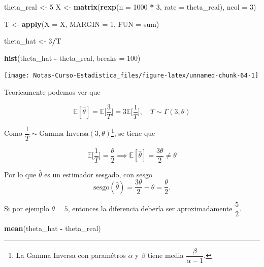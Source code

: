 \documentclass[
  12pt,
]{book}
\newenvironment{Shaded}{\begin{snugshade}}{\end{snugshade}}
\newcommand{\DataTypeTok}[1]{\textcolor[rgb]{0.13,0.29,0.53}{#1}}
\newcommand{\DecValTok}[1]{\textcolor[rgb]{0.00,0.00,0.81}{#1}}
\newcommand{\KeywordTok}[1]{\textcolor[rgb]{0.13,0.29,0.53}{\textbf{#1}}}
\newcommand{\NormalTok}[1]{#1}
\newcommand{\OperatorTok}[1]{\textcolor[rgb]{0.81,0.36,0.00}{\textbf{#1}}}
\newcommand{\StringTok}[1]{\textcolor[rgb]{0.31,0.60,0.02}{#1}}
\begin{document}
\begin{Shaded}
\begin{Highlighting}[]
\NormalTok{theta\_real \textless{}{-}}\StringTok{ }\DecValTok{5}
\NormalTok{X \textless{}{-}}\StringTok{ }\KeywordTok{matrix}\NormalTok{(}\KeywordTok{rexp}\NormalTok{(}\DataTypeTok{n =} \DecValTok{1000} \OperatorTok{*}\StringTok{ }\DecValTok{3}\NormalTok{, }\DataTypeTok{rate =}\NormalTok{ theta\_real), }
    \DataTypeTok{ncol =} \DecValTok{3}\NormalTok{)}

\NormalTok{T \textless{}{-}}\StringTok{ }\KeywordTok{apply}\NormalTok{(}\DataTypeTok{X =}\NormalTok{ X, }\DataTypeTok{MARGIN =} \DecValTok{1}\NormalTok{, }\DataTypeTok{FUN =}\NormalTok{ sum)}

\NormalTok{theta\_hat \textless{}{-}}\StringTok{ }\DecValTok{3}\OperatorTok{/}\NormalTok{T}

\KeywordTok{hist}\NormalTok{(theta\_hat }\OperatorTok{{-}}\StringTok{ }\NormalTok{theta\_real, }\DataTypeTok{breaks =} \DecValTok{100}\NormalTok{)}
\end{Highlighting}
\end{Shaded}

\begin{center}\texttt{[image: Notas-Curso-Estadistica\_files/figure-latex/unnamed-chunk-64-1]} \end{center}

Teoricamente podemos ver que

\[\mathbb E[\hat\theta] = \mathbb E\bigg[\dfrac 3T\bigg]= 3\mathbb E\bigg[\dfrac
1T\bigg], \quad T\sim \Gamma(3,\theta)\]

Como \(\dfrac 1T \sim \text{Gamma Inversa}(3,\theta)\)\footnote{La Gamma Inversa con paramétros \(\alpha\) y \(\beta\) tiene media \(\dfrac{\beta}{\alpha-1}.\)}, se tiene que

\[\mathbb E\bigg[\dfrac 1T\bigg] = \dfrac{\theta}2 \implies \mathbb E[\hat
\theta] =\dfrac{3\theta}2 \neq \theta\]

Por lo que \(\hat \theta\) es un estimador sesgado, con sesgo
\[\text{sesgo}(\hat\theta) = \dfrac{3\theta}{2} -\theta = \dfrac \theta 2.\]

Si por ejemplo \(\theta=5\), entonces la diferencia debería ser aproximadamente
\(\dfrac 5 2\).

\begin{Shaded}
\begin{Highlighting}[]
\KeywordTok{mean}\NormalTok{(theta\_hat }\OperatorTok{{-}}\StringTok{ }\NormalTok{theta\_real)}
\end{Highlighting}
\end{Shaded}
\end{document}
